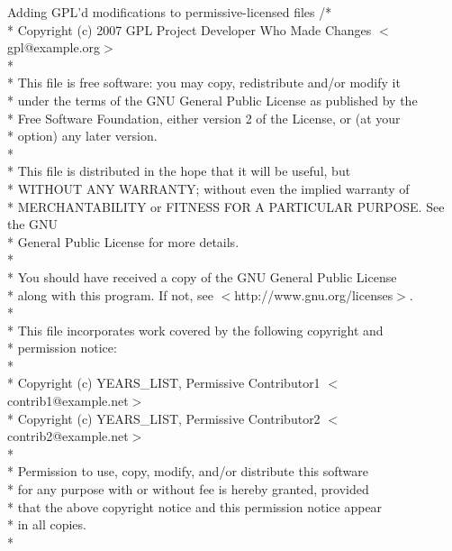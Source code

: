 \documentclass{beamer}
\begin{document}
\begin{frame}

\begin{block}{Adding GPL'd modifications to permissive-licensed files}
\tiny
/*  \\
 * Copyright (c) 2007  GPL Project Developer Who Made Changes $<$gpl@example.org$>$  \\
 *  \\
 *  This file is free software: you may copy, redistribute and/or modify it  \\
 *  under the terms of the GNU General Public License as published by the   \\
 *  Free Software Foundation, either version 2 of the License, or (at your   \\
 *  option) any later version.   \\
 *  \\
 *  This file is distributed in the hope that it will be useful, but   \\
 *  WITHOUT ANY WARRANTY; without even the implied warranty of   \\
 *  MERCHANTABILITY or FITNESS FOR A PARTICULAR PURPOSE.  See the GNU   \\
 *  General Public License for more details.   \\
 *  \\
 *  You should have received a copy of the GNU General Public License   \\
 *  along with this program.  If not, see $<$http://www.gnu.org/licenses$>$.  \\ 
 *  \\
\pause
 * \alert{This file incorporates work covered by the following copyright and}   \\
 * \alert{permission notice:}   \\
 *   \\
 *     \alert{Copyright (c) YEARS\_LIST, Permissive Contributor1 $<$contrib1@example.net$>$}   \\
 *     \alert{Copyright (c) YEARS\_LIST, Permissive Contributor2 $<$contrib2@example.net$>$}   \\
 *   \\
 *     \alert{Permission to use, copy, modify, and/or distribute this software}   \\
 *     \alert{for any purpose with or without fee is hereby granted, provided}   \\
 *     \alert{that the above copyright notice and this permission notice appear}   \\
 *     \alert{in all copies.}   \\
 *   
\end{block}

\end{frame}
\end{document}
